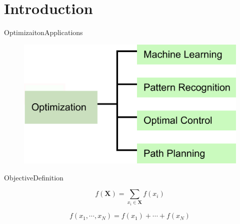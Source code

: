 \section{Introduction}

\begin{frame}{Optimizaiton}{Applications}
\begin{figure}
	\centering
	\includegraphics[width = .8\textwidth]{./figure/optimization}
\end{figure}
\end{frame}

\begin{frame}{Objective}{Definition}
\begin{block}{}
\begin{equation}
\nonumber
f( \mathbf{X} ) = \sum_{ x_{i} \in \mathbf{X} } f(x_{i})
\end{equation}
\end{block}
\end{frame}

\begin{frame}
\begin{block}{}
\begin{equation}
\nonumber
f(x_{1} , \cdots , x_{N} )= f(x_{1}) + \cdots + f(x_{N})
\end{equation}
\end{block}
\end{frame}

